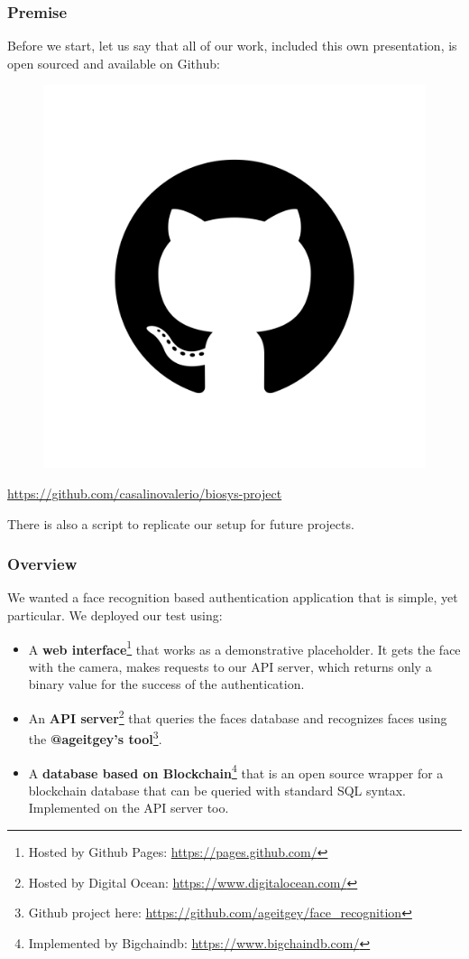 \begin{frame} \frametitle{Premise}

	Before we start, let us say that all of our work, included this own
	presentation, is open sourced and available on Github:
	
	\begin{center}
		\begin{figure}[H]
			\includegraphics[width=.3\textwidth]{img/github}
		\end{figure}
		{\color{red} \url{https://github.com/casalinovalerio/biosys-project}}
	\end{center}
	\vfill
	There is also a script to replicate our setup for future projects.
	
\end{frame}

\begin{frame} \frametitle{Overview}
	We wanted a face recognition based authentication application that is simple, 
	yet particular. We deployed our test using:

	\vfill
	\begin{itemize}

		\item A \textbf{web interface}\footnote{Hosted by Github Pages: 
		{\color{red}\url{https://pages.github.com/}}} that works as a 
		demonstrative placeholder. It gets the face with the camera, makes 
		requests to our API server, which returns only a binary value for the 
		success of the authentication.
	
		\item An \textbf{API server}\footnote{Hosted by Digital Ocean: 
		{\color{red} \url{https://www.digitalocean.com/}}} that queries the 
		faces database and recognizes faces using the \textbf{@ageitgey's 
		tool}\footnote{Github project here: {\color{red} 
		\url{https://github.com/ageitgey/face_recognition}}}.
	
		\item A \textbf{database based on Blockchain}\footnote{Implemented by 
		Bigchaindb: {\color{red} \url{https://www.bigchaindb.com/}}} that is an
		open source wrapper for a blockchain database that can be queried with 
		standard SQL syntax. Implemented on the API server too.
	
	\end{itemize}
	\vfill
\end{frame}

